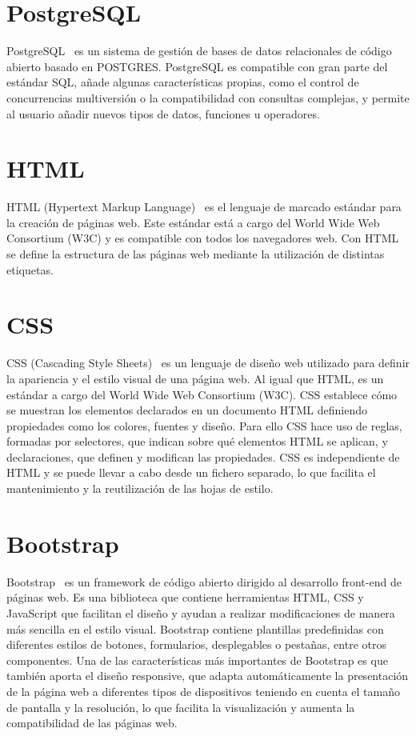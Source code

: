 \documentclass[a4paper, 12pt]{book}
\begin{document}
\section{PostgreSQL} 
\label{sec:postgresql}

PostgreSQL~\cite{postgresql} es un sistema de gestión de bases de datos relacionales de código abierto basado en POSTGRES. PostgreSQL es compatible con gran parte del estándar SQL, añade algunas características propias, como el control de concurrencias multiversión o la compatibilidad con consultas complejas, y permite al usuario añadir nuevos tipos de datos, funciones u operadores.

\section{HTML} 
\label{sec:html}

HTML (Hypertext Markup Language)~\cite{htmlcss} es el lenguaje de marcado estándar para la creación de páginas web. Este estándar está a cargo del World Wide Web Consortium (W3C) y es compatible con todos los navegadores web.
Con HTML se define la estructura de las páginas web mediante la utilización de distintas etiquetas.

\section{CSS} 
\label{sec:css}

CSS (Cascading Style Sheets)~\cite{htmlcss} es un lenguaje de diseño web utilizado para definir la apariencia y el estilo visual de una página web. Al igual que HTML, es un estándar a cargo del World Wide Web Consortium (W3C).
CSS establece cómo se muestran los elementos declarados en un documento HTML definiendo propiedades como los colores, fuentes y diseño. Para ello CSS hace uso de reglas, formadas por selectores, que indican sobre qué elementos HTML se aplican, y declaraciones, que definen y modifican las propiedades.
CSS es independiente de HTML y se puede llevar a cabo desde un fichero separado, lo que facilita el mantenimiento y la reutilización de las hojas de estilo.


\section{Bootstrap} 
\label{sec:bootstrap}

Bootstrap~\cite{bootstrap} es un framework de código abierto dirigido al desarrollo front-end de páginas web. Es una biblioteca que contiene herramientas HTML, CSS y JavaScript que facilitan el diseño y ayudan a realizar modificaciones de manera más sencilla en el estilo visual. Bootstrap contiene plantillas predefinidas con diferentes estilos de botones, formularios, desplegables o pestañas, entre otros componentes. Una de las características más importantes de Bootstrap es que también aporta el diseño responsive, que adapta automáticamente la presentación de la página web a diferentes tipos de dispositivos teniendo en cuenta el tamaño de pantalla y la resolución, lo que facilita la visualización y aumenta la compatibilidad de las páginas web.
\end{document}
